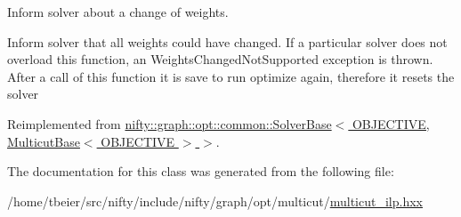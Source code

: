 Inform solver about a change of weights. 

Inform solver that all weights could have changed. If a particular solver does not overload this function, an Weights\+Changed\+Not\+Supported exception is thrown. After a call of this function it is save to run optimize again, therefore it resets the solver 

Reimplemented from \hyperlink{classnifty_1_1graph_1_1opt_1_1common_1_1SolverBase_a6a5d77ee514c4b5f44d1908c1000f0ff}{nifty\+::graph\+::opt\+::common\+::\+Solver\+Base$<$ O\+B\+J\+E\+C\+T\+I\+V\+E, Multicut\+Base$<$ O\+B\+J\+E\+C\+T\+I\+V\+E $>$ $>$}.



The documentation for this class was generated from the following file\+:\begin{DoxyCompactItemize}
\item 
/home/tbeier/src/nifty/include/nifty/graph/opt/multicut/\hyperlink{multicut__ilp_8hxx}{multicut\+\_\+ilp.\+hxx}\end{DoxyCompactItemize}
